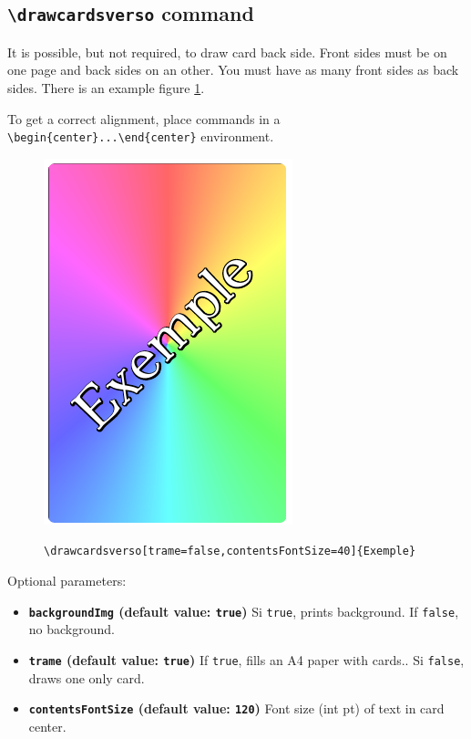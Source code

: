 \documentclass[a4paper, 12pt]{article}
\newcommand{\key}[3]{\textbf{\texttt{#1} (default value: \texttt{#2})} #3}
\newcommand{\commande}[1]{\texttt{\textbackslash#1}}
\begin{document}
	\subsection{\commande{drawcardsverso} command}
It is possible, but not required, to draw card back side. Front sides must be on one page and back sides on an other. You must have as many front sides as back sides. There is an example figure \ref{fig:verso}.

To get a correct alignment, place commands in a  \verb!\begin{center}...\end{center}! environment.
\begin{figure}[h]\begin{center}
	\caption{\commande{drawcardsverso[trame=false,contentsFontSize=40]\{Exemple\}}}
	\includegraphics{screen02.png}\label{fig:verso}
\end{center}\end{figure}

Optional parameters:
\begin{itemize}
	\item \key{backgroundImg}{true}{Si \texttt{true}, prints background. If \texttt{false}, no background.}
	\item \key{trame}{true}{If \texttt{true}, fills an A4 paper with cards.. Si \texttt{false}, draws one only card.}
	\item \key{contentsFontSize}{120}{Font size (int pt) of text in card center.}
\end{itemize}
\end{document}

